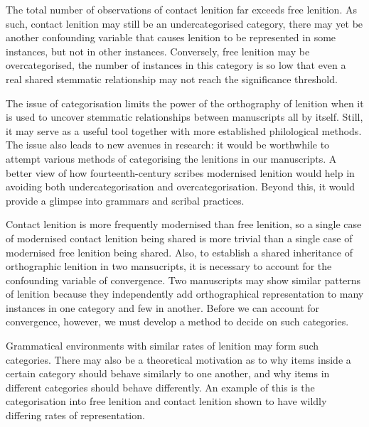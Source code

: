 The total number of observations of contact lenition far exceeds free lenition. As such, contact lenition may still be an undercategorised category, \ie there may yet be another confounding variable that causes lenition to be represented in some instances, but not in other instances. Conversely, free lenition may be overcategorised, \ie the number of instances in this category is so low that even a real shared stemmatic relationship may not reach the significance threshold. 

The issue of categorisation  limits the power of the orthography of lenition when it is used to uncover stemmatic relationships between manuscripts all by itself. Still, it may serve as a useful tool together with more established philological methods. The issue also leads to new avenues in research: it would be worthwhile to attempt various methods of categorising the lenitions in our manuscripts. A better view of how fourteenth-century scribes modernised lenition would help in avoiding both undercategorisation and overcategorisation. Beyond this, it would provide a glimpse into  grammars and scribal practices.


Contact lenition is more frequently modernised than free lenition, so a single case of modernised contact lenition being shared is more trivial than a single case of modernised free lenition being shared. 
Also, to establish a shared inheritance of orthographic lenition in two mansucripts,  it is necessary to account for the confounding variable of convergence. Two manuscripts may show similar patterns of lenition because they independently add orthographical representation to many instances in one category and few in another. Before we can account for convergence, however, we must develop a method to decide on such categories.

Grammatical environments with similar rates of lenition may form such categories. There may also be a theoretical motivation as to why items inside a certain category should behave similarly to one another, and why items in different categories should behave differently. An example of this is the categorisation into free lenition and contact lenition shown to have wildly differing rates of representation.

